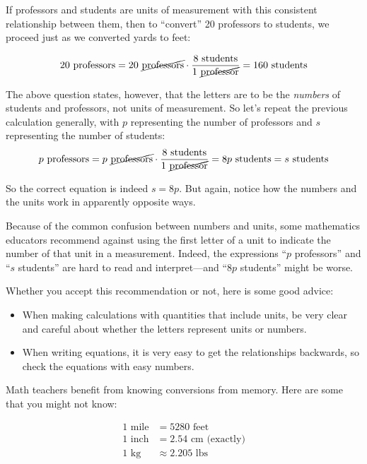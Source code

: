 \documentclass[nooutcomes]{ximera}
\begin{document}
If professors and students are units of measurement with this consistent relationship between them, then to ``convert''  20 professors to students, we proceed just as we converted yards to feet:  

\[
20\textrm{ professors} = 20\textrm{ \cancel{professors}} \cdot \frac{{8 \textrm{ students}}}{1\textrm{ \cancel{professor}}} = 
 160\textrm{ students}
\]

The above question states, however, that the letters are to be the \emph{numbers} of students and professors, not units of measurement.  So let's repeat the previous calculation generally, with $p$ representing the number of professors and $s$ representing the number of students:  
\[
p\textrm{ professors} = p\textrm{ \cancel{professors}} \cdot \frac{{8 \textrm{ students}}}{1\textrm{ \cancel{professor}}} = 
 8p\textrm{ students} = s \textrm{ students}
\]

So the correct equation is indeed $s = 8p$.  But again, notice how the numbers and the units work in apparently opposite ways.  

Because of the common confusion between numbers and units, some mathematics educators recommend against using the first letter of a unit to indicate the number of that unit in a measurement.  Indeed, the expressions ``$p$ professors'' and ``$s$ students'' are hard to read and interpret---and ``$8p$ students'' might be worse.  

Whether you accept this recommendation or not, here is some good advice:  
\begin{itemize}
\item When making calculations with quantities that include units, be very clear and careful about whether the letters represent units or numbers.  
\item When writing equations, it is very easy to get the relationships backwards, so check the equations with easy numbers.  
\end{itemize}

Math teachers benefit from knowing conversions from memory.  Here are some that you might not know:  

\begin{align*}
1\textrm{ mile} &= 5280\textrm{ feet} \\
1\textrm{ inch} &= 2.54\textrm{ cm (exactly)} \\
1\textrm{ kg} &\approx 2.205 \textrm{ lbs}\\
\end{align*}
\end{document}
